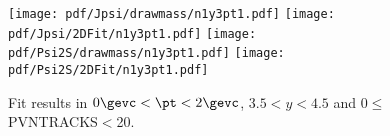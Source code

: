 \begin{figure}[H]
\begin{center}
\texttt{[image: pdf/Jpsi/drawmass/n1y3pt1.pdf]}
\texttt{[image: pdf/Jpsi/2DFit/n1y3pt1.pdf]}
\vspace*{-0.5cm}
\texttt{[image: pdf/Psi2S/drawmass/n1y3pt1.pdf]}
\texttt{[image: pdf/Psi2S/2DFit/n1y3pt1.pdf]}
\vspace*{-0.5cm}
\end{center}
\caption{Fit results in $0\gevc<\pt<2\gevc$, $3.5<y<4.5$ and 0$\leq$PVNTRACKS$<$20.}
\label{Fitn1y3pt1}
\end{figure}
